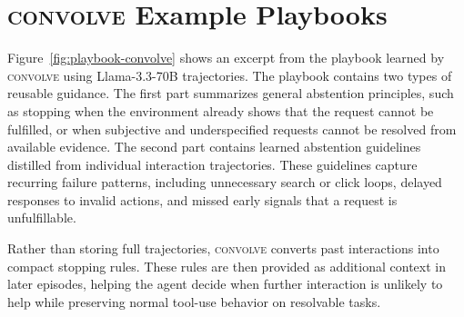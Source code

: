 \documentclass{article}
\newcommand{\method}{\textsc{convolve}\xspace}
\begin{document}
\section{\method Example Playbooks}
\label{app:playbook}

Figure~\ref{fig:playbook-convolve} shows an excerpt from the playbook learned by \method using Llama-3.3-70B trajectories. The playbook contains two types of reusable guidance. The first part summarizes general abstention principles, such as stopping when the environment already shows that the request cannot be fulfilled, or when subjective and underspecified requests cannot be resolved from available evidence. The second part contains learned abstention guidelines distilled from individual interaction trajectories. These guidelines capture recurring failure patterns, including unnecessary search or click loops, delayed responses to invalid actions, and missed early signals that a request is unfulfillable.

Rather than storing full trajectories, \method converts past interactions into compact stopping rules. These rules are then provided as additional context in later episodes, helping the agent decide when further interaction is unlikely to help while preserving normal tool-use behavior on resolvable tasks.
\end{document}
